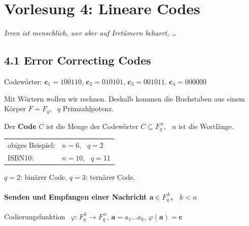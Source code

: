 \section{Vorlesung 4: Lineare Codes}
\textit{Irren ist menschlich, wer aber auf Irrtümern beharrt, \dots}

\subsection{4.1 Error Correcting Codes}

\begin{beispiel}
Codewörter: \quad $\mathbf{c}_1 = 100110$, $\mathbf{c}_2 = 010101$, $\mathbf{c}_3 = 001011$, $\mathbf{c}_4 = 000000$
\end{beispiel}

Mit Wörtern wollen wir rechnen. Deshalb kommen die Buchstaben aus einem Körper $F = F_q$, \ $q$ Primzahlpotenz.

\begin{definition}[Code]
Der \textbf{Code} $C$ ist die Menge der Codewörter $C \subseteq F_q^{\,n}$, \ $n$ ist die Wortlänge.
\end{definition}

\begin{tabular}{ll}
obiges Beispiel: & $n = 6$, \ $q = 2$ \\
ISBN10: & $n = 10$, \ $q = 11$ \\
\end{tabular}

$q = 2$: binärer Code, \quad $q = 3$: ternärer Code.

\paragraph{Senden und Empfangen einer Nachricht $\mathbf{a} \in F_q^{\,k}$, \ $k < n$}
Codierungsfunktion \ $\varphi : F_q^{\,k} \to F_q^{\,n}$, \quad $\mathbf{a} = a_1 \dots a_k$, \quad $\varphi(\mathbf{a}) = \mathbf{c}$

